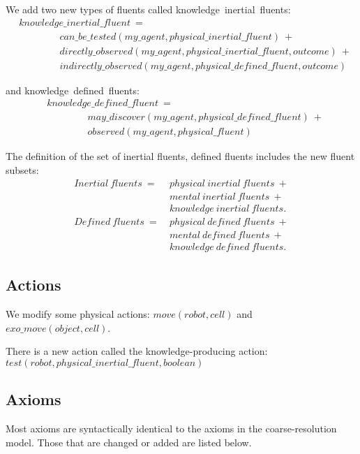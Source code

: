 \documentclass[11pt, oneside]{article}
\begin{document}
We add two new types of fluents called knowledge\ inertial\ fluents:
 \begin{align*} 
 &knowledge\_inertial\_fluent\ =\\
 &\hspace{50pt}can\_be\_tested(my\_agent, physical\_inertial\_fluent)\ +\\
 &\hspace{50pt}directly\_observed(my\_agent, physical\_inertial\_fluent, outcome)\ +\\
 &\hspace{50pt}indirectly\_observed(my\_agent, physical\_defined\_fluent, outcome)
 \end{align*}
 
 and knowledge\ defined\ fluents:
\begin{align*}
&knowledge\_defined\_fluent\ =\\
&\hspace{50pt}may\_discover(my\_agent, physical\_defined\_fluent)\ +\\
&\hspace{50pt}observed(my\_agent,physical\_fluent)
\end{align*}

The definition of the set of inertial fluents, defined fluents includes the new fluent subsets: 
\begin{align*}
Inertial\ fluents\ =\ &physical\ inertial\ fluents\ +\\ &mental\ inertial\ fluents\ +\\ &knowledge\ inertial\ fluents.\\
Defined\ fluents\ =\ &physical\ defined\ fluents\ +\\ &mental\ defined\ fluents\ +\\ &knowledge\ defined\ fluents.
\end{align*}



\subsection{Actions}
We modify some physical actions: $move(robot,cell)$ and $exo\_move(object,cell)$.

There is a new action called the knowledge-producing action: $test(robot,physical\_inertial\_fluent, boolean)$

\subsection{Axioms}
Most axioms are syntactically identical to the axioms in the coarse-resolution model. Those that are changed or added are listed below.
\end{document}
